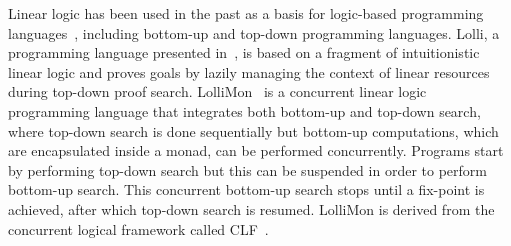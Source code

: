 Linear logic has been used in the past as a basis for logic-based programming
languages~\cite{Miller85anoverview}, including bottom-up and top-down
programming languages. Lolli, a programming language presented
in~\cite{Hodas94logicprogramming}, is based on a fragment of intuitionistic
linear logic and proves goals by lazily managing the context of linear resources
during top-down proof search.  LolliMon~\cite{Lopez:2005:MCL:1069774.1069778} is
a concurrent linear logic programming language that integrates both bottom-up
and top-down search, where top-down search is done sequentially but bottom-up
computations, which are encapsulated inside a monad, can be performed
concurrently. Programs start by performing top-down search but this can be
suspended in order to perform bottom-up search. This concurrent bottom-up search
stops until a fix-point is achieved, after which top-down search is resumed.
LolliMon is derived from the concurrent logical framework called
CLF~\cite{Watkins:2004uq,Cervesato02aconcurrent,Watkins03aconcurrent}.                   

